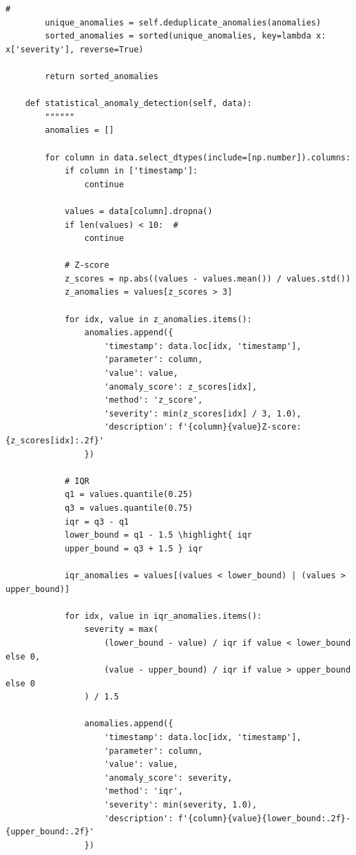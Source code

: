 \begin{lstlisting}[style=python]
        # 
        unique_anomalies = self.deduplicate_anomalies(anomalies)
        sorted_anomalies = sorted(unique_anomalies, key=lambda x: x['severity'], reverse=True)
        
        return sorted_anomalies
    
    def statistical_anomaly_detection(self, data):
        """"""
        anomalies = []
        
        for column in data.select_dtypes(include=[np.number]).columns:
            if column in ['timestamp']:
                continue
                
            values = data[column].dropna()
            if len(values) < 10:  # 
                continue
            
            # Z-score
            z_scores = np.abs((values - values.mean()) / values.std())
            z_anomalies = values[z_scores > 3]
            
            for idx, value in z_anomalies.items():
                anomalies.append({
                    'timestamp': data.loc[idx, 'timestamp'],
                    'parameter': column,
                    'value': value,
                    'anomaly_score': z_scores[idx],
                    'method': 'z_score',
                    'severity': min(z_scores[idx] / 3, 1.0),
                    'description': f'{column}{value}Z-score: {z_scores[idx]:.2f}'
                })
            
            # IQR
            q1 = values.quantile(0.25)
            q3 = values.quantile(0.75)
            iqr = q3 - q1
            lower_bound = q1 - 1.5 \highlight{ iqr
            upper_bound = q3 + 1.5 } iqr
            
            iqr_anomalies = values[(values < lower_bound) | (values > upper_bound)]
            
            for idx, value in iqr_anomalies.items():
                severity = max(
                    (lower_bound - value) / iqr if value < lower_bound else 0,
                    (value - upper_bound) / iqr if value > upper_bound else 0
                ) / 1.5
                
                anomalies.append({
                    'timestamp': data.loc[idx, 'timestamp'],
                    'parameter': column,
                    'value': value,
                    'anomaly_score': severity,
                    'method': 'iqr',
                    'severity': min(severity, 1.0),
                    'description': f'{column}{value}{lower_bound:.2f}-{upper_bound:.2f}'
                })
        

\end{lstlisting}
